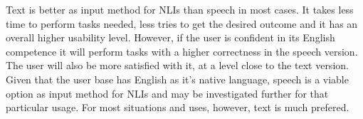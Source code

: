 Text is better as input method for NLIs than speech in most cases. It takes less time to perform tasks needed, less tries to get the desired outcome and it has an overall higher usability level. However, if the user is confident in its English competence it will perform tasks with a higher correctness in the speech version. The user will also be more satisfied with it, at a level close to the text version. Given that the user base has English as it's native language, speech is a viable option as input method for NLIs and may be investigated further for that particular usage. For most situations and uses, however, text is much prefered.
